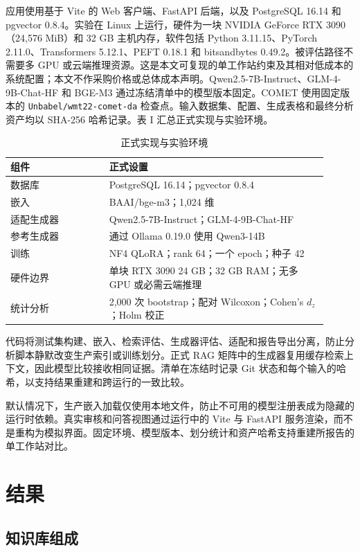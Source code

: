 应用使用基于 Vite 的 Web 客户端、FastAPI 后端，以及 PostgreSQL 16.14 和 pgvector 0.8.4。实验在 Linux 上运行，硬件为一块 NVIDIA GeForce RTX 3090（24,576 MiB）和 32 GB 主机内存，软件包括 Python 3.11.15、PyTorch 2.11.0、Transformers 5.12.1、PEFT 0.18.1 和 bitsandbytes 0.49.2。被评估路径不需要多 GPU 或云端推理资源。这是本文可复现的单工作站约束及其相对低成本的系统配置；本文不作采购价格或总体成本声明。Qwen2.5-7B-Instruct、GLM-4-9B-Chat-HF 和 BGE-M3 通过冻结清单中的模型版本固定。COMET 使用固定版本的 \texttt{Unbabel/wmt22-comet-da} 检查点。输入数据集、配置、生成表格和最终分析资产均以 SHA-256 哈希记录。表 I 汇总正式实现与实验环境。

\begin{table}[ht]
\centering
\caption{正式实现与实验环境}
\begin{tabular}{p{0.29\linewidth}p{0.62\linewidth}}
\toprule
组件 & 正式设置 \\
\midrule
数据库 & PostgreSQL 16.14；pgvector 0.8.4 \\
嵌入 & BAAI/bge-m3；1,024 维 \\
适配生成器 & Qwen2.5-7B-Instruct；GLM-4-9B-Chat-HF \\
参考生成器 & 通过 Ollama 0.19.0 使用 Qwen3-14B \\
训练 & NF4 QLoRA；rank 64；一个 epoch；种子 42 \\
硬件边界 & 单块 RTX 3090 24 GB；32 GB RAM；无多 GPU 或必需云端推理 \\
统计分析 & 2,000 次 bootstrap；配对 Wilcoxon；Cohen's $d_z$；Holm 校正 \\
\bottomrule
\end{tabular}
\end{table}

代码将测试集构建、嵌入、检索评估、生成器评估、适配和报告导出分离，防止分析脚本静默改变生产索引或训练划分。正式 RAG 矩阵中的生成器复用缓存检索上下文，因此模型比较接收相同证据。清单在冻结时记录 Git 状态和每个输入的哈希，以支持结果重建和跨运行的一致比较。

默认情况下，生产嵌入加载仅使用本地文件，防止不可用的模型注册表成为隐藏的运行时依赖。真实审核和问答视图通过运行中的 Vite 与 FastAPI 服务渲染，而不是重构为模拟界面。固定环境、模型版本、划分统计和资产哈希支持重建所报告的单工作站对比。

\section{结果}

\subsection{知识库组成}

